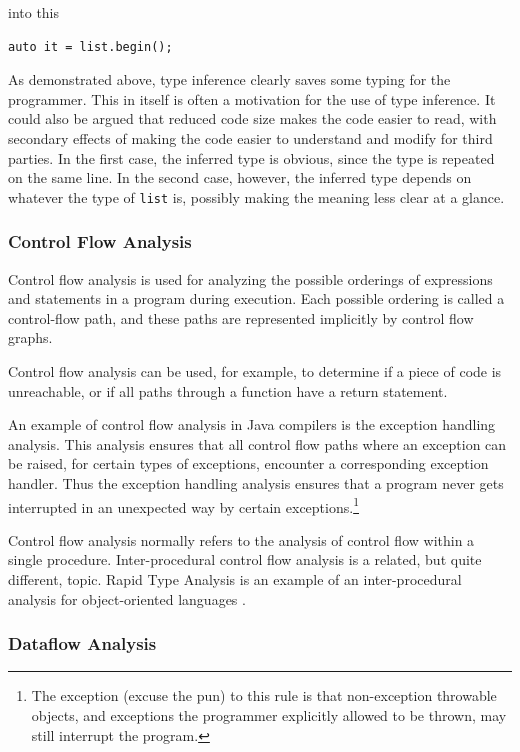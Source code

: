 \documentclass[10pt, twoside, openright]{book}
\begin{document}
\noindent
into this

\begin{lstlisting}
auto it = list.begin();
\end{lstlisting}

As demonstrated above, type inference clearly saves some typing
for the programmer. This in itself is often a motivation for the use of type inference.
It could also be argued that reduced code size makes the code easier to read,
with secondary effects of making the code easier to understand and modify for third parties.
In the first case, the inferred type is obvious, since the type
is repeated on the same line. In the second case, however, the inferred type depends on whatever
the type of \texttt{list} is, possibly making the meaning less clear at a glance.


\subsubsection{Control Flow Analysis}

Control flow analysis is used for analyzing the possible orderings of expressions and
statements in a program during execution. Each possible ordering is called a control-flow path,
and these paths are represented implicitly by control flow graphs.

Control flow analysis can be used, for example, to determine if a piece of code is unreachable, or
if all paths through a function have a return statement.

An example of control flow analysis in Java compilers is the exception handling analysis.
This analysis ensures that all control flow paths where an exception can
be raised, for certain types of exceptions, encounter a corresponding exception handler.
Thus the exception handling analysis ensures that a program never gets interrupted in an
unexpected way by certain exceptions.\footnote{The exception (excuse the pun) to this rule
is that non-exception throwable objects, and exceptions the programmer explicitly allowed
to be thrown, may still interrupt the program.}

Control flow analysis normally refers to the analysis of control flow within a single procedure.
Inter-procedural control flow analysis is a related, but quite different, topic.
Rapid Type Analysis is an example of an inter-procedural analysis for object-oriented languages
\cite{DBLP:conf/oopsla/BaconS96}.


\subsubsection{Dataflow Analysis}
\end{document}
